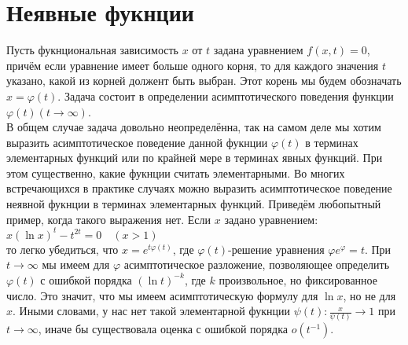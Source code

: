 \documentclass{report}
\begin{document}
\section{Неявные фукнции}
Пусть фукнциональная зависимость $x$ от $t$ задана уравнением $f(x,t)=0$, причём если уравнение имеет больше одного корня, то для каждого значения $t$ указано, какой из корней
должент быть выбран. Этот корень мы будем обозначать $x=\varphi(t)$. Задача состоит в определении асимптотического поведения функции $\varphi(t)(t\to\infty)$. \\
В общем случае задача довольно неопределённа, так на самом деле мы хотим выразить асимптотическое поведение данной фукнции $\varphi(t)$ в терминах элементарных функций или по
крайней мере в терминах явных функций. При этом существенно, какие фукнции считать элементарными. Во многих встречающихся в практике случаях можно выразить асимптотическое поведение
неявной фукнции в терминах элементарных функций. Приведём любопытный пример, когда такого выражения нет. Если $x$ задано уравнением: \\
$x(\ln{x})^{t}-t^{2t}=0\quad(x>1)$ \\
то легко убедиться, что $x=e^{t\varphi(t)}$, где $\varphi(t)$-решение уравнения $\varphi e^{\varphi}=t$. При $t\to\infty$ мы имеем для $\varphi$ асимптотическое разложение, позволяющее
определить $\varphi(t)$ с ошибкой порядка $(\ln{t})^{-k}$, где $k$ произвольное, но фиксированное число. Это значит, что мы имеем асимптотическую формулу для $\ln{x}$, но не для $x$.
Иными словами, у нас нет такой элементарной фукнции $\psi(t):\frac{x}{\psi(t)}\to{1}$ при $t\to\infty$, иначе бы существовала оценка с ошибкой порядка $o(t^{-1})$.
\newpage
\end{document}
